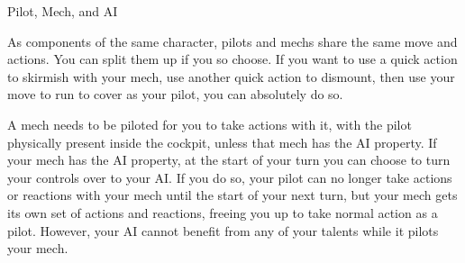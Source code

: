                                                 Pilot, Mech, and AI

As components of the same character, pilots and mechs share the same move and actions. You
can split them up if you so choose. If you want to use a quick action to skirmish with your mech,
use another quick action to dismount, then use your move to run to cover as your pilot, you can
absolutely do so.

A mech needs to be piloted for you to take actions with it, with the pilot physically present inside
the cockpit, unless that mech has the AI property. If your mech has the AI property, at the start of
your turn you can choose to turn your controls over to your AI. If you do so, your pilot can no
longer take actions or reactions with your mech until the start of your next turn, but your mech
gets its own set of actions and reactions, freeing you up to take normal action as a pilot. However,
your AI cannot benefit from any of your talents while it pilots your mech.